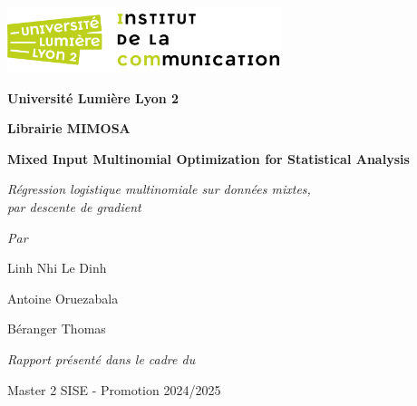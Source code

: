 \documentclass[10pt,french]{report}
\begin{document}
	\begin{titlepage}
		\centering
		\includegraphics[width=0.6\textwidth]{icom.png}\par\vspace{0.5cm}
		{\Large\bfseries Université Lumière Lyon 2}\par
        \par\vspace{3.5cm}



		{\Huge\bfseries Librairie MIMOSA}\par\vspace{0.75cm}
		{\huge\bfseries Mixed Input Multinomial Optimization for Statistical Analysis}\par\vspace{0.75cm}

		{\Large\itshape Régression logistique multinomiale sur données mixtes,\\par descente de gradient}\par\vspace{3.5cm}

		{\Large\itshape Par}\par
		{\Large Linh Nhi Le Dinh}\par
		{\Large Antoine Oruezabala}\par
		{\Large Béranger Thomas}\par\vspace{1cm}

		{\large\itshape Rapport présenté dans le cadre du}\par
		{\large Master 2 SISE - Promotion 2024/2025}\par\vspace{1cm}

		\vfill

	\end{titlepage}

	\tableofcontents

	\setlength{\parskip}{12pt}

	\begin{abstract}
		Ce rapport détaille l'implémentation de la régression logistique multinomiale pour des données mixtes, en langage R, et en utilisant la descente de gradient. Nous couvrons tout d'abord quelques fondements théoriques, puis l'approche pratique et enfin discutons des résultats obtenus. En fin d'ouvrage, un lexique donne une définition des termes et expressions souvent usité en régression logistique.

		Ce rapport a été rédigé en novembre 2024 dans le cadre d'un projet du master 2 SISE.
	\end{abstract}
\end{document}
